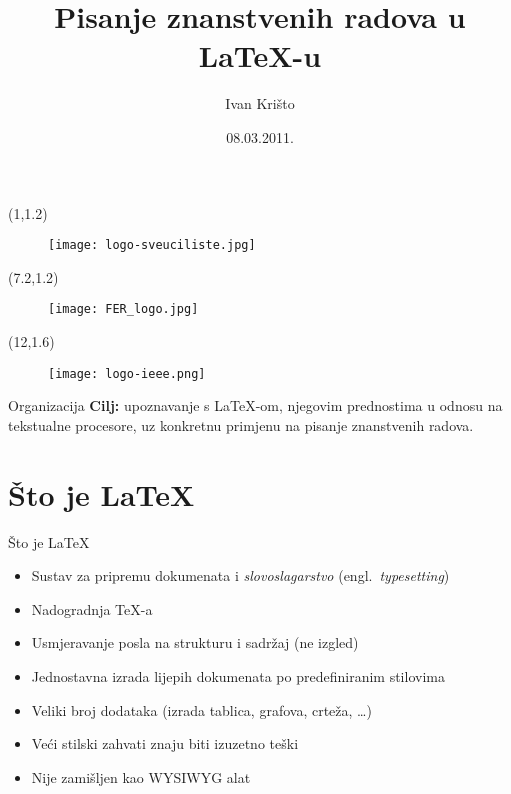 \documentclass{beamer}
\title{Pisanje znanstvenih radova u \LaTeX-u}
\author{Ivan Krišto}
\institute[Universities of]
{
Fakultet Elektrotehnike i Računarstva\\
Sveučilište u Zagrebu}
\date{08.03.2011.}
\begin{document}
\begin{frame}
\begin{textblock}{7}(1,1.2)
\begin{figure}
\centering
\texttt{[image: logo-sveuciliste.jpg]}
\end{figure}
\end{textblock}

\begin{textblock}{7}(7.2,1.2)
\begin{figure}
\centering
\texttt{[image: FER\_logo.jpg]}
\end{figure}
\end{textblock}

\begin{textblock}{7}(12,1.6)
\begin{figure}
\centering
\texttt{[image: logo-ieee.png]}
\end{figure}
\end{textblock}

\vspace{70pt}
\titlepage
\end{frame}


\begin{frame}[t]{Organizacija}
\textbf{Cilj:} upoznavanje s \LaTeX-om, njegovim prednostima u odnosu na
tekstualne procesore, uz konkretnu primjenu na pisanje znanstvenih radova.

\begin{multicols}{2}
\tableofcontents
\end{multicols}
\end{frame}

\section{Što je \LaTeX{}}
\begin{frame}[t]{Što je \LaTeX{}}
\begin{itemize}
  \item Sustav za pripremu dokumenata i \emph{slovoslagarstvo} (engl.\ \emph{typesetting})
  \item Nadogradnja \TeX-a
  \item Usmjeravanje posla na strukturu i sadržaj (ne izgled)
  \item Jednostavna izrada lijepih dokumenata po predefiniranim stilovima
  \item Veliki broj dodataka (izrada tablica, grafova, crteža, \ldots)
  \item Veći stilski zahvati znaju biti izuzetno teški
  \item Nije zamišljen kao WYSIWYG alat
\end{itemize}
\end{frame}
\end{document}
